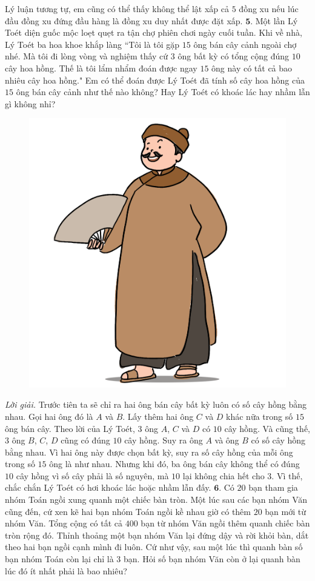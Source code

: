 \begin{multicols}{2}
	Lý luận tương tự, em cũng có thể thấy không thể lật xấp cả $5$ đồng xu nếu lúc đầu đồng xu đứng đầu hàng là đồng xu duy nhất  được đặt xấp.
	\vskip 0.1cm
	$\pmb{5.}$ Một lần Lý Toét diện guốc mộc loẹt quẹt ra tận chợ phiên chơi ngày cuối tuần. Khi về nhà, Lý Toét ba hoa khoe khắp làng ``Tôi là tôi gặp $15$ ông bán cây cảnh ngoài chợ nhé. Mà tôi đi lòng vòng và nghiệm thấy cứ $3$ ông bất kỳ có tổng cộng đúng $10$ cây hoa hồng. Thế là tôi lẩm nhẩm đoán được ngay $15$ ông này có tất cả bao nhiêu cây hoa hồng."
	\vskip 0.1cm
	Em có thể đoán được Lý Toét đã tính số cây hoa hồng của $15$ ông bán cây cảnh như thế nào không? Hay Lý Toét có khoác lác hay nhầm lẫn gì không nhỉ?
	\begin{figure}[H]
		\centering
		\vspace*{-5pt}
		\captionsetup{labelformat= empty, justification=centering}
		\includegraphics[width=0.58\linewidth]{Pi12_Bai5}
		\vspace*{-10pt}
	\end{figure}
	\textit{Lời giải.} Trước tiên ta sẽ chỉ ra hai ông bán cây bất kỳ luôn có số cây hồng bằng nhau. Gọi hai ông đó là $A$ và $B$. Lấy thêm hai ông $C$ và $D$ khác nữa trong số $15$ ông bán cây. Theo lời của Lý Toét, $3$ ông $A$, $C$ và $D$ có $10$ cây hồng. Và cũng thế, $3$ ông $B$, $C$, $D$ cũng có đúng $10$ cây hồng. Suy ra  ông $A$ và ông $B$ có số cây hồng bằng nhau.  Vì hai ông này được chọn bất kỳ, suy ra số cây hồng của mỗi ông trong số $15$ ông là như nhau.
	\vskip 0.1cm
	Nhưng khi đó, ba ông bán cây không thể có đúng $10$ cây hồng vì số cây phải là số nguyên, mà $10$ lại không chia hết cho $3$.
	\vskip 0.1cm
	Vì thế, chắc chắn Lý Toét có hơi khoác lác hoặc nhầm lẫn đấy. 
	\vskip 0.1cm
	$\pmb{6.}$ Có $20$ bạn tham gia nhóm Toán ngồi xung quanh một chiếc bàn tròn. Một lúc sau các bạn nhóm Văn cũng đến, cứ xen kẽ hai bạn nhóm Toán ngồi kề nhau giờ có thêm $20$ bạn mới từ nhóm Văn. Tổng cộng có tất cả $400$ bạn từ nhóm Văn ngồi thêm quanh chiếc bàn tròn rộng đó. Thỉnh thoảng một bạn nhóm Văn lại đứng dậy và rời khỏi bàn, dắt theo hai bạn ngồi cạnh mình đi luôn. Cứ như vậy, sau một lúc thì quanh bàn số bạn nhóm Toán còn lại chỉ là $3$ bạn. Hỏi số bạn nhóm Văn còn ở lại quanh bàn lúc đó ít nhất phải là bao nhiêu?

\end{multicols}

